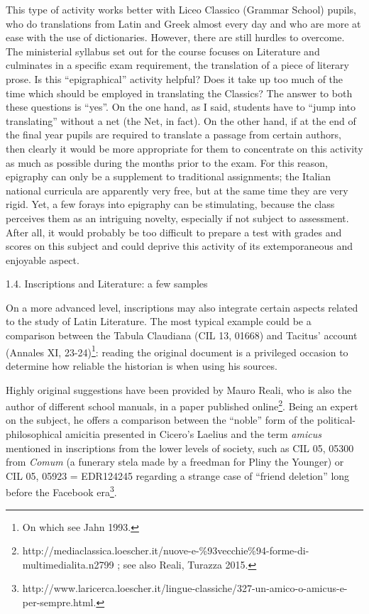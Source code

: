 \documentclass[amsthm,ebook]{saparticle}
\begin{document}
This type of activity works better with Liceo Classico (Grammar School) pupils, who do translations from Latin and Greek
almost every day and who are more at ease with the use of dictionaries. However, there are still hurdles to overcome.
The ministerial syllabus set out for the course focuses on Literature and culminates in a specific exam requirement,
the translation of a piece of literary prose. Is this “epigraphical” activity helpful? Does it take up too much of the
time which should be employed in translating the Classics? The answer to both these questions is “yes”. On the one
hand, as I said, students have to “jump into translating” without a net (the Net, in fact). On the other hand, if at
the end of the final year pupils are required to translate a passage from certain authors, then clearly it would be
more appropriate for them to concentrate on this activity as much as possible during the months prior to the exam. For
this reason, epigraphy can only be a supplement to traditional assignments; the Italian national curricula are
apparently very free, but at the same time they are very rigid. Yet, a few forays into epigraphy can be stimulating,
because the class perceives them as an intriguing novelty, especially if not subject to assessment. After all, it would
probably be too difficult to prepare a test with grades and scores on this subject and could deprive this activity of
its extemporaneous and enjoyable aspect.

1.4. Inscriptions and Literature: a few samples

On a more advanced level, inscriptions may also integrate certain aspects related to the study of Latin Literature. The
most typical example could be a comparison between the Tabula Claudiana (CIL 13, 01668) and Tacitus’ account (Annales
XI, 23-24)\footnote{ On which see Jahn 1993.}: reading the original document is a privileged occasion to determine how
reliable the historian is when using his sources.

Highly original suggestions have been provided by Mauro Reali, who is also the author of different school manuals, in a
paper published online\footnote{http://mediaclassica.loescher.it/nuove-e-\%93vecchie\%94-forme-di-multimedialita.n2799
; see also Reali, Turazza 2015.}. Being an expert on the subject, he offers a comparison between the “noble” form of
the political-philosophical amicitia presented in Cicero’s Laelius and the term \emph{amicus} mentioned in inscriptions
from the lower levels of society, such as CIL 05, 05300 from \emph{Comum} (a funerary stela made by a freedman for
Pliny the Younger) or CIL 05, 05923 = EDR124245 regarding a strange case of “friend deletion” long before the Facebook
era\footnote{ http://www.laricerca.loescher.it/lingue-classiche/327-un-amico-o-amicus-e-per-sempre.html.}.
\end{document}
